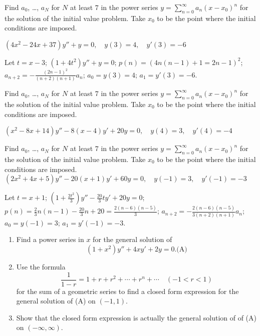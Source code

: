 \documentclass{ximera}
\begin{document}
\begin{problem}\label{exer:7.2.24}  Find $a_0$, \dots, $a_N$ for $N$ at least $7$ in the power series
$y=\sum_{n=0}^\infty a_n(x-x_0)^n$
 for the  solution of the initial value problem.  Take $x_0$ to be the
point where the initial conditions are imposed.

$(4x^2-24x+37)y''+y=0,\quad y(3)=4,\quad
y'(3)=-6$

\begin{solution}
    Let $t=x-3$; $(1+4t^2)y''+y=0$;
$p(n)=(4n(n-1)+1=2n-1)^2$;
$a_{n+2}=-\frac{(2n-1)^2}{(n+2)(n+1)}a_n$;
$a_0=y(3)=4$; $a_1=y'(3)=-6$.
\end{solution}
\end{problem}

\begin{problem}\label{exer:7.2.25}  Find $a_0$, \dots, $a_N$ for $N$ at least $7$ in the power series
$y=\sum_{n=0}^\infty a_n(x-x_0)^n$
 for the  solution of the initial value problem.  Take $x_0$ to be the
point where the initial conditions are imposed.

$(x^2-8x+14)y''-8(x-4)y'+20y=0,\quad
y(4)=3,\quad y'(4)=-4$
\end{problem}

\begin{problem}\label{exer:7.2.26}  Find $a_0$, \dots, $a_N$ for $N$ at least $7$ in the power series
$y=\sum_{n=0}^\infty a_n(x-x_0)^n$
 for the  solution of the initial value problem.  Take $x_0$ to be the
point where the initial conditions are imposed.
$(2x^2+4x+5)y''-20(x+1)y'+60y=0,\quad y(-1)=3,\quad y'(-1)=-3$

\begin{solution}
    Let $t=x+1$;
$\left(1+\frac{2t^2}{3}\right)y''-\frac{20}{3}ty'+20y=0$;
$p(n)=\frac{2}{3}n(n-1)-\frac{20}{3}n+20=\frac{2(n-6)(n-5)}{3}$;
$a_{n+2}=-\frac{2(n-6)(n-5)}{3(n+2)(n+1)}a_n$;
$a_0=y(-1)=3$; $a_1=y'(-1)=-3$.
\end{solution}
\end{problem}

\begin{problem}\label{exer:7.2.27}
\begin{enumerate}
\item %
Find a power series in $x$ for the general solution of
$$
(1+x^2)y''+4xy'+2y=0.
\text{(A)}
$$
\item %
Use the formula
$$
\frac{1}{1-r}=1+r+r^2+\cdots+r^n+\cdots \quad(-1<r<1)
$$
for the sum of a geometric series to find a closed form expression for
the general solution of (A) on $(-1,1)$.
\item %
Show that the closed form expression is actually the general
solution of of (A) on $(-\infty,\infty)$.
\end{enumerate}
\end{problem}
\end{document}
